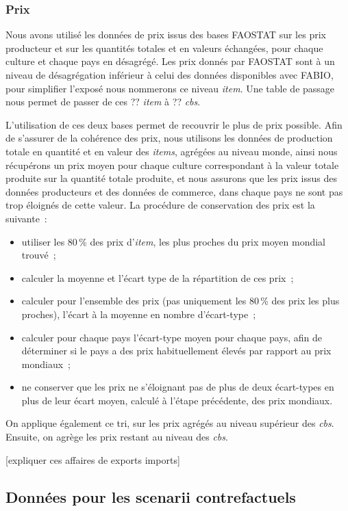 \subsubsection{Prix}
Nous avons utilisé les données de prix issus des bases FAOSTAT sur les prix producteur et sur les quantités totales et en valeurs échangées, pour chaque culture et chaque pays en désagrégé. Les prix donnés par FAOSTAT sont à un niveau de désagrégation inférieur à celui des données disponibles avec FABIO, pour simplifier l'exposé nous nommerons ce niveau \textit{item}. Une table de passage nous permet de passer de ces ?? \textit{item} à ?? \textit{cbs}.

L'utilisation de ces deux bases permet de recouvrir le plus de prix possible. Afin de s'assurer de la cohérence des prix, nous utilisons les données de production totale en quantité et en valeur des \textit{items}, agrégées au niveau monde, ainsi nous récupérons un prix moyen pour chaque culture correspondant à la valeur totale produite sur la quantité totale produite, et nous assurons que les prix issus des données producteurs et des données de commerce, dans chaque pays ne sont pas trop éloignés de cette valeur. La procédure de conservation des prix est la suivante~:
\begin{itemize}
    \item utiliser les 80\,\% des prix d'\textit{item}, les plus proches du prix moyen mondial trouvé~;
    \item calculer la moyenne et l'écart type de la répartition de ces prix~;
    \item calculer pour l'ensemble des prix (pas uniquement les 80\,\% des prix les plus proches), l'écart à la moyenne en nombre d’écart-type~;
    \item calculer pour chaque pays l'écart-type moyen pour chaque pays, afin de déterminer si le pays a des prix habituellement élevés par rapport au prix mondiaux~;
    \item ne conserver que les prix ne s'éloignant pas de plus de deux écart-types en plus de leur écart moyen, calculé à l'étape précédente, des prix mondiaux.
\end{itemize}
On applique également ce tri, sur les prix agrégés au niveau supérieur des \textit{cbs}. Ensuite, on agrège les prix restant au niveau des \textit{cbs}.

[expliquer ces affaires de exports imports]

\subsection{Données pour les scenarii contrefactuels}
